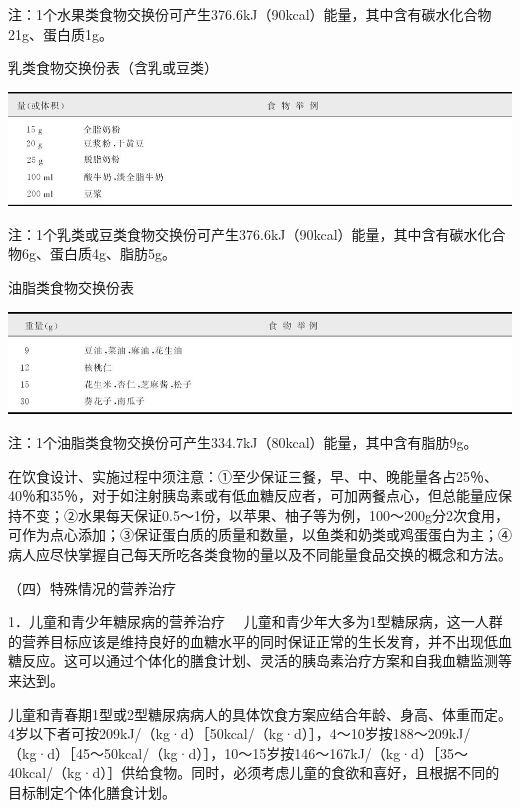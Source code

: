 注：1个水果类食物交换份可产生376.6kJ（90kcal）能量，其中含有碳水化合物21g、蛋白质1g。

\begin{table}[htbp]
\centering
\caption{乳类食物交换份表（含乳或豆类）}
\label{tab3-21}
\includegraphics{./images/Image00037.jpg}
\end{table}

注：1个乳类或豆类食物交换份可产生376.6kJ（90kcal）能量，其中含有碳水化合物6g、蛋白质4g、脂肪5g。

\begin{table}[htbp]
\centering
\caption{油脂类食物交换份表}
\label{tab3-22}
\includegraphics{./images/Image00038.jpg}
\end{table}

注：1个油脂类食物交换份可产生334.7kJ（80kcal）能量，其中含有脂肪9g。

在饮食设计、实施过程中须注意：①至少保证三餐，早、中、晚能量各占25％、40％和35％，对于如注射胰岛素或有低血糖反应者，可加两餐点心，但总能量应保持不变；②水果每天保证0.5～1份，以苹果、柚子等为例，100～200g分2次食用，可作为点心添加；③保证蛋白质的质量和数量，以鱼类和奶类或鸡蛋蛋白为主；④病人应尽快掌握自己每天所吃各类食物的量以及不同能量食品交换的概念和方法。

（四）特殊情况的营养治疗

{1．儿童和青少年糖尿病的营养治疗}
　儿童和青少年大多为1型糖尿病，这一人群的营养目标应该是维持良好的血糖水平的同时保证正常的生长发育，并不出现低血糖反应。这可以通过个体化的膳食计划、灵活的胰岛素治疗方案和自我血糖监测等来达到。

儿童和青春期1型或2型糖尿病病人的具体饮食方案应结合年龄、身高、体重而定。4岁以下者可按209kJ/（kg·d）［50kcal/（kg·d）］，4～10岁按188～209kJ/（kg·d）［45～50kcal/（kg·d）］，10～15岁按146～167kJ/（kg·d）［35～40kcal/（kg·d）］供给食物。同时，必须考虑儿童的食欲和喜好，且根据不同的目标制定个体化膳食计划。

